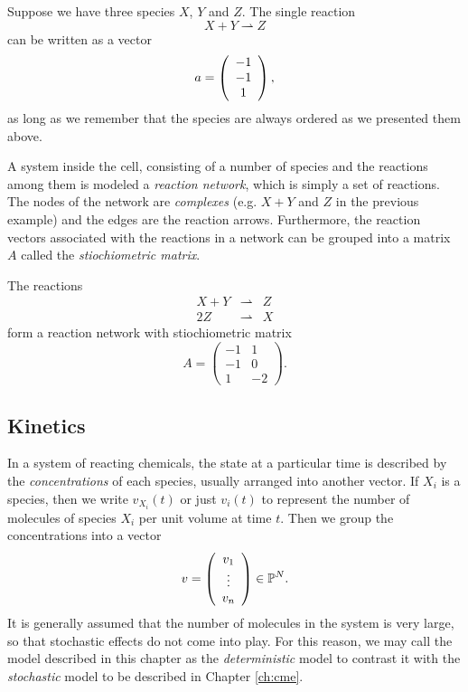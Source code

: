 \begin{example} \label{ex:reaction} Suppose we have three species $X$, $Y$ and $Z$. The single reaction 
%
$$
X + Y \rightharpoonup Z
$$
%
can be written as a vector
%
$$
a = \left ( \begin{array}{c} -1 \\ -1 \\ 1 \end{array} \right ), 
$$
%
as long as we remember that the species are always ordered as we
presented them above. \enx
\end{example}

A system inside the cell, consisting of a number of species and the
reactions among them is modeled a {\em reaction network}, which is
simply a set of reactions. The nodes of the network are {\em
  complexes} (e.g. $X+Y$ and $Z$ in the previous example) and the
edges are the reaction arrows. Furthermore, the reaction vectors
associated with the reactions in a network can be grouped into a
matrix $A$ called the {\em stiochiometric matrix}.

\begin{example} \label{ex:network}
The reactions 
\begin{eqnarray}
X + Y & \rightharpoonup & Z \\
2Z & \rightharpoonup & X
\end{eqnarray}
%
form a reaction network with stiochiometric matrix
%
$$
A = \left ( \begin{array}{cc}
-1 & 1 \\
-1 & 0 \\
1 & -2
\end{array} \right ).
$$
%
\enx
\end{example}

\subsection{Kinetics}

In a system of reacting chemicals, the state at a particular time is
described by the {\em concentrations} of each species, usually
arranged into another vector. If $X_i$ is a species, then we write
$v_{X_i}(t)$ or just $v_i(t)$ to represent the number of molecules of
species $X_i$ per unit volume at time $t$. Then we group the
concentrations into a vector
%
$$
v = \left ( \begin{array}{c} v_1 \\ \vdots \\ v_n \end{array} \right ) \in \mathbb{P}^N.
$$
%
It is generally assumed that the number of molecules in the
system is very large, so that stochastic effects do not come into
play. For this reason, we may call the model described in this chapter
as the {\em deterministic} model to contrast it with the {\em
  stochastic} model to be described in Chapter \ref{ch:cme}.

